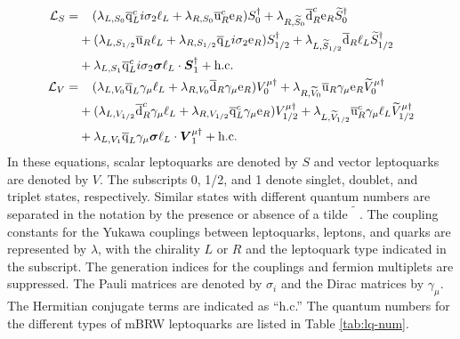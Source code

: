 \begin{align}
\label{eq:Lagrangian-SLQ}
\mathcal{L}_{S} = &\hphantom{+~}(\lambda_{L,S_{0}} \overline{\mathrm{q}}_{L}^{c} i\sigma_{2} \ell_{L} + \lambda_{R,S_{0}} \overline{\mathrm{u}}_{R}^{c} \mathrm{e}_{R})S_{0}^{\dagger}
+ \lambda_{R,\widetilde{S}_{0}} \overline{\mathrm{d}}_{R}^{c} \mathrm{e}_{R} \widetilde{S}_{0}^{\dagger} \nonumber \\
&+ (\lambda_{L,S_{1/2}} \overline{\mathrm{u}}_{R} \ell_{L} + \lambda_{R,S_{1/2}} \overline{\mathrm{q}}_{L} i\sigma_{2} \mathrm{e}_{R})S_{1/2}^{\dagger}
+ \lambda_{L,\widetilde{S}_{1/2}} \overline{\mathrm{d}}_{R} \ell_{L} \widetilde{S}_{1/2}^{\dagger} \nonumber \\
&+ \lambda_{L,S_{1}} \overline{\mathrm{q}}_{L}^{c} i\sigma_{2}\boldsymbol{\sigma} \ell_{L} \cdot \boldsymbol{S}_{1}^{\dagger} + \text{h.c.} \\
\label{eq:Lagrangian-VLQ}
\mathcal{L}_{V} = &\hphantom{+~}(\lambda_{L,V_{0}} \overline{\mathrm{q}}_{L} \gamma_{\mu} \ell_{L} + \lambda_{R,V_{0}} \overline{\mathrm{d}}_{R} \gamma_{\mu} \mathrm{e}_{R})V_{0}^{\mu\dagger}
+ \lambda_{R,\widetilde{V}_{0}} \overline{\mathrm{u}}_{R} \gamma_{\mu} \mathrm{e}_{R} \widetilde{V}_{0}^{\mu\dagger} \nonumber \\
&+ (\lambda_{L,V_{1/2}} \overline{\mathrm{d}}_{R}^{c} \gamma_{\mu} \ell_{L} + \lambda_{R,V_{1/2}} \overline{\mathrm{q}}_{L}^{c} \gamma_{\mu} \mathrm{e}_{R})V_{1/2}^{\mu\dagger}
+ \lambda_{L,\widetilde{V}_{1/2}} \overline{\mathrm{u}}_{R}^{c} \gamma_{\mu} \ell_{L} \widetilde{V}_{1/2}^{\mu\dagger} \nonumber \\
&+ \lambda_{L,V_{1}} \overline{\mathrm{q}}_{L} \gamma_{\mu}\boldsymbol{\sigma} \ell_{L} \cdot \boldsymbol{V}_{1}^{\mu\dagger} + \text{h.c.}
\end{align}
In these equations, scalar leptoquarks are denoted by $S$ and vector leptoquarks are denoted by $V$. The subscripts 0, 1/2, and 1 denote singlet, doublet, and triplet states, respectively. Similar states with different quantum numbers are separated in the notation by the presence or absence of a tilde $\widetilde{\phantom{S}}$. The coupling constants for the Yukawa couplings between leptoquarks, leptons, and quarks are represented by $\lambda$, with the chirality $L$ or $R$ and the leptoquark type indicated in the subscript. The generation indices for the couplings and fermion multiplets are suppressed. The Pauli matrices are denoted by $\sigma_{i}$ and the Dirac matrices by $\gamma_{\mu}$. The Hermitian conjugate terms are indicated as ``h.c.'' The quantum numbers for the different types of mBRW leptoquarks are listed in Table \ref{tab:lq-num}.

